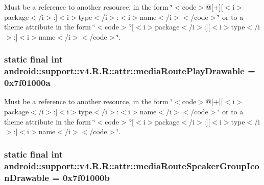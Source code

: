 Must be a reference to another resource, in the form \char`\"{}$<$code$>$@\mbox{[}+\mbox{]}\mbox{[}$<$i$>$package$<$/i$>$:\mbox{]}$<$i$>$type$<$/i$>$:$<$i$>$name$<$/i$>$$<$/code$>$\char`\"{} or to a theme attribute in the form \char`\"{}$<$code$>$?\mbox{[}$<$i$>$package$<$/i$>$:\mbox{]}\mbox{[}$<$i$>$type$<$/i$>$:\mbox{]}$<$i$>$name$<$/i$>$$<$/code$>$\char`\"{}. \hypertarget{classandroid_1_1support_1_1v4_1_1_r_1_1attr_1d90bb363e884d680a1011a911d9fe4c}{
\subsubsection[{mediaRoutePlayDrawable}]{\setlength{\rightskip}{0pt plus 5cm}static final int android::support::v4.R.R::attr::mediaRoutePlayDrawable = 0x7f01000a}}
\label{classandroid_1_1support_1_1v4_1_1_r_1_1attr_1d90bb363e884d680a1011a911d9fe4c}


Must be a reference to another resource, in the form \char`\"{}$<$code$>$@\mbox{[}+\mbox{]}\mbox{[}$<$i$>$package$<$/i$>$:\mbox{]}$<$i$>$type$<$/i$>$:$<$i$>$name$<$/i$>$$<$/code$>$\char`\"{} or to a theme attribute in the form \char`\"{}$<$code$>$?\mbox{[}$<$i$>$package$<$/i$>$:\mbox{]}\mbox{[}$<$i$>$type$<$/i$>$:\mbox{]}$<$i$>$name$<$/i$>$$<$/code$>$\char`\"{}. \hypertarget{classandroid_1_1support_1_1v4_1_1_r_1_1attr_3424f54730cefd524a2f29e884345413}{
\subsubsection[{mediaRouteSpeakerGroupIconDrawable}]{\setlength{\rightskip}{0pt plus 5cm}static final int android::support::v4.R.R::attr::mediaRouteSpeakerGroupIconDrawable = 0x7f01000b}}
\label{classandroid_1_1support_1_1v4_1_1_r_1_1attr_3424f54730cefd524a2f29e884345413}


